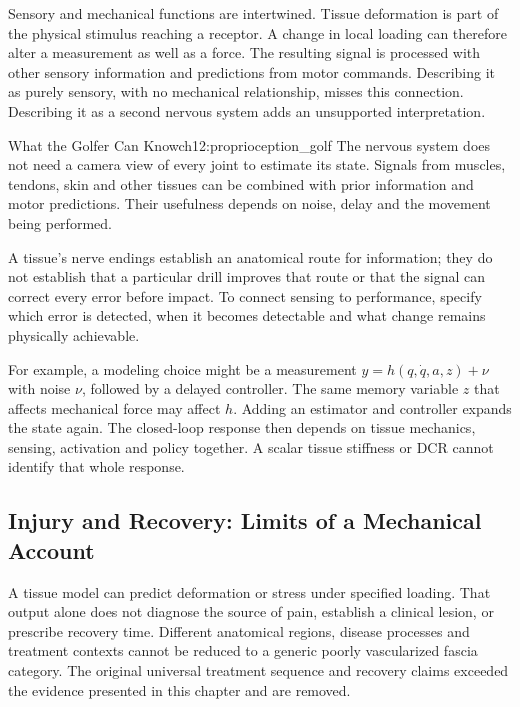 Sensory and mechanical functions are intertwined. Tissue deformation is part of the physical stimulus reaching a receptor. A change in local loading can therefore alter a measurement as well as a force. The resulting signal is processed with other sensory information and predictions from motor commands. Describing it as purely sensory, with no mechanical relationship, misses this connection. Describing it as a second nervous system adds an unsupported interpretation.

\begin{laymansbox}{What the Golfer Can Know}{ch12:proprioception_golf}
The nervous system does not need a camera view of every joint to estimate its state. Signals from muscles, tendons, skin and other tissues can be combined with prior information and motor predictions. Their usefulness depends on noise, delay and the movement being performed.

A tissue's nerve endings establish an anatomical route for information; they do not establish that a particular drill improves that route or that the signal can correct every error before impact. To connect sensing to performance, specify which error is detected, when it becomes detectable and what change remains physically achievable.
\end{laymansbox}

For example, a modeling choice might be a measurement $y=h(q,\dot q,a,z)+\nu$ with noise $\nu$, followed by a delayed controller. The same memory variable $z$ that affects mechanical force may affect $h$. Adding an estimator and controller expands the state again. The closed-loop response then depends on tissue mechanics, sensing, activation and policy together. A scalar tissue stiffness or DCR cannot identify that whole response.

\subsection{Injury and Recovery: Limits of a Mechanical Account}

A tissue model can predict deformation or stress under specified loading. That output alone does not diagnose the source of pain, establish a clinical lesion, or prescribe recovery time. Different anatomical regions, disease processes and treatment contexts cannot be reduced to a generic poorly vascularized fascia category. The original universal treatment sequence and recovery claims exceeded the evidence presented in this chapter and are removed.

